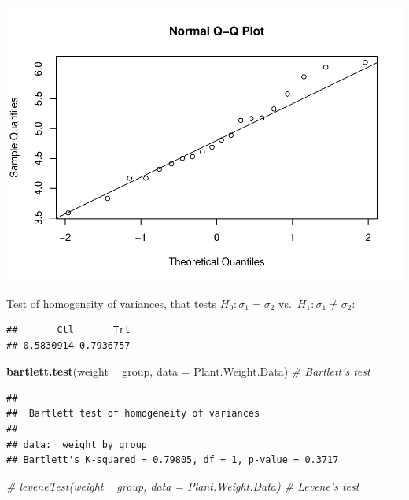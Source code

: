 \documentclass[
]{book}
\newenvironment{Shaded}{\begin{snugshade}}{\end{snugshade}}
\newcommand{\CommentTok}[1]{\textcolor[rgb]{0.56,0.35,0.01}{\textit{#1}}}
\newcommand{\DataTypeTok}[1]{\textcolor[rgb]{0.13,0.29,0.53}{#1}}
\newcommand{\KeywordTok}[1]{\textcolor[rgb]{0.13,0.29,0.53}{\textbf{#1}}}
\newcommand{\NormalTok}[1]{#1}
\newcommand{\OperatorTok}[1]{\textcolor[rgb]{0.81,0.36,0.00}{\textbf{#1}}}
\newcommand{\StringTok}[1]{\textcolor[rgb]{0.31,0.60,0.02}{#1}}
\begin{document}
\includegraphics{SurveyBook_files/figure-latex/testing11-1.pdf}

Test of homogeneity of variances, that tests \(H_0 : \sigma_1 = \sigma_2\) vs.~\(H_1 : \sigma_1 \ne \sigma_2\):

\begin{Shaded}
\end{Shaded}

\begin{verbatim}
##       Ctl       Trt 
## 0.5830914 0.7936757
\end{verbatim}

\begin{Shaded}
\begin{Highlighting}[]
\KeywordTok{bartlett.test}\NormalTok{(weight }\OperatorTok{~}\StringTok{ }\NormalTok{group, }\DataTypeTok{data =}\NormalTok{ Plant.Weight.Data) }\CommentTok{# Bartlett's test}
\end{Highlighting}
\end{Shaded}

\begin{verbatim}
## 
## 	Bartlett test of homogeneity of variances
## 
## data:  weight by group
## Bartlett's K-squared = 0.79805, df = 1, p-value = 0.3717
\end{verbatim}

\begin{Shaded}
\begin{Highlighting}[]
\CommentTok{# leveneTest(weight ~ group, data = Plant.Weight.Data) # Levene's test}
\end{Highlighting}
\end{Shaded}
\end{document}
